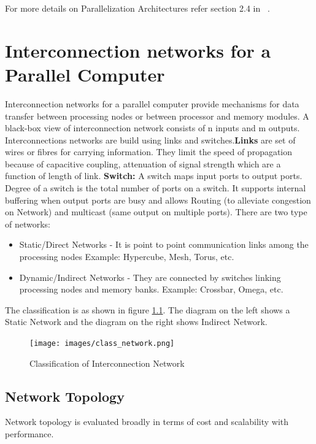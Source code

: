 \documentclass[12pt]{book}
\begin{document}
For more details on Parallelization Architectures refer section 2.4 in ~\cite{grama2008introduction}.

\chapter{Interconnection networks for a Parallel Computer}
Interconnection networks for a parallel computer provide mechanisms for data transfer between processing nodes or between
processor and memory modules. A black-box view of interconnection network consists of n inputs and m outputs. Interconnections networks are build using links and switches.\textbf{Links} are set of wires 
or fibres for carrying information. They limit the speed of propagation because of capacitive coupling, attenuation of signal strength 
which are a function of length of link. \textbf{Switch: }A switch maps input ports to output ports. Degree of a switch is the total number of ports on a switch.
It supports internal buffering when output ports are busy and allows Routing (to alleviate congestion on Network) and 
multicast (same output on multiple ports). There are two type of networks:
\begin{itemize}
    \item Static/Direct Networks - It is point to point communication links among the processing nodes Example: Hypercube, Mesh, Torus, etc.
    \item Dynamic/Indirect Networks - They are connected by switches linking processing nodes and memory banks. Example: Crossbar, Omega, etc.
\end{itemize}
The classification is as shown in figure \ref{fig:class_network}. The diagram on the left shows a Static Network and the diagram on the right shows Indirect Network.
\begin{figure}[H]
    \centering
    \texttt{[image: images/class\_network.png]}
    \caption{Classification of Interconnection Network}
    \label{fig:class_network}
\end{figure}

\section{Network Topology}
Network topology is evaluated broadly in terms of cost and scalability with performance.
\end{document}
